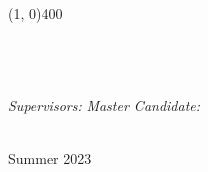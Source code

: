 \begin{titlepage}
	\scshape{\huge{{\thesisUniversity}}} \\
	\line(1, 0){400} \\[2mm]


	\textsf{\thesisUniversityDepartment} \\
	\textsf{\thesisUniversityGroup} \\

	\vfill
	{\LARGE \color{ctcolortitle}\textbf{\thesisTitle} \\[10mm]}


	\begin{center}

	\vfill
	\begin{normalsize}
	\begin{flushleft}	  
	  \textit{Supervisors:} \hfill \textit{Master Candidate:}\\
		\vspace{1pt}

		\thesisFirstSupervisor \hfill {\Large \thesisName} \\


		\vspace{30pt}
		\centering
		Summer 2023

	\end{flushleft}
	\end{normalsize}
	
	\end{center}
	\vspace*{\fill}
	\singlespacing
	\cleardoublepage


	\vfill
\end{titlepage}


